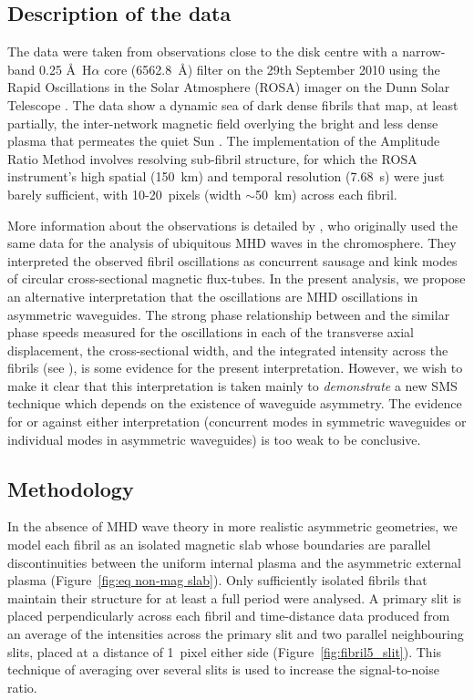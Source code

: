 \documentclass[12pt]{../style-files/ociamthesis}
\begin{document}
\subsection{Description of the data} \label{sec: data}

The data were taken from observations close to the disk centre with a narrow-band 0.25 \AA~H$\alpha$ core (6562.8~\AA) filter on the 29th September 2010 using the Rapid Oscillations in the Solar Atmosphere (ROSA) imager on the Dunn Solar Telescope \citep{jes_etal10a}. The data show a dynamic sea of dark dense fibrils that map, at least partially, the inter-network magnetic field overlying the bright and less dense plasma that permeates the quiet Sun \citep{lee_etal12}. The implementation of the Amplitude Ratio Method involves resolving sub-fibril structure, for which the ROSA instrument’s high spatial (150~km) and temporal resolution (7.68~s) were just barely sufficient, with 10-20~pixels (width $\sim$50~km) across each fibril.

More information about the observations is detailed by \citealp{mor12}, who originally used the same data for the analysis of ubiquitous MHD waves in the chromosphere. They interpreted the observed fibril oscillations as concurrent sausage and kink modes of circular cross-sectional magnetic flux-tubes. In the present analysis, we propose an alternative interpretation that the oscillations are MHD oscillations in asymmetric waveguides. The strong phase relationship between and the similar phase speeds measured for the oscillations in each of the transverse axial displacement, the cross-sectional width, and the integrated intensity across the fibrils (see \citealp{mor12}), is some evidence for the present interpretation. However, we wish to make it clear that this interpretation is taken mainly to \textit{demonstrate} a new SMS technique which depends on the existence of waveguide asymmetry. The evidence for or against either interpretation (concurrent modes in symmetric waveguides or individual modes in asymmetric waveguides) is too weak to be conclusive.


\subsection{Methodology}

In the absence of MHD wave theory in more realistic asymmetric geometries, we model each fibril as an isolated magnetic slab whose boundaries are parallel discontinuities between the uniform internal plasma and the asymmetric external plasma (Figure~\ref{fig:eq non-mag slab}). Only sufficiently isolated fibrils that maintain their structure for at least a full period were analysed. A primary slit is placed perpendicularly across each fibril and time-distance data produced from an average of the intensities across the primary slit and two parallel neighbouring slits, placed at a distance of 1~pixel either side (Figure~\ref{fig:fibril5_slit}). This technique of averaging over several slits is used to increase the signal-to-noise ratio.
\end{document}
